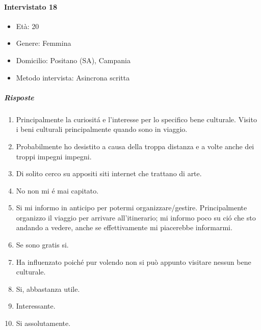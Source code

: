 \documentclass{article}
\begin{document}
\paragraph{Intervistato 18}
\begin{itemize}
\item Età: 20
\item Genere: Femmina
\item Domicilio: Positano (SA), Campania
\item Metodo intervista: Asincrona scritta
\end{itemize}
\subparagraph{Risposte}
\begin{enumerate}
\item Principalmente la curiositá e l'interesse per lo specifico bene culturale. Visito i beni culturali principalmente quando sono in viaggio.
\item Probabilmente ho desistito a causa della troppa distanza e a volte anche dei troppi impegni impegni.
\item Di solito cerco su appositi siti internet che trattano di arte.
\item No non mi é mai capitato.
\item Si mi informo in anticipo per potermi organizzare/gestire. Principalmente organizzo il viaggio per arrivare all'itinerario; mi informo poco su ció che sto andando a vedere, anche se effettivamente mi piacerebbe informarmi.
\item Se sono gratis si.
\item Ha influenzato poiché pur volendo non si può appunto visitare nessun bene culturale.
\item Si, abbastanza utile.
\item Interessante.
\item Si assolutamente.
\end{enumerate}
\end{document}
